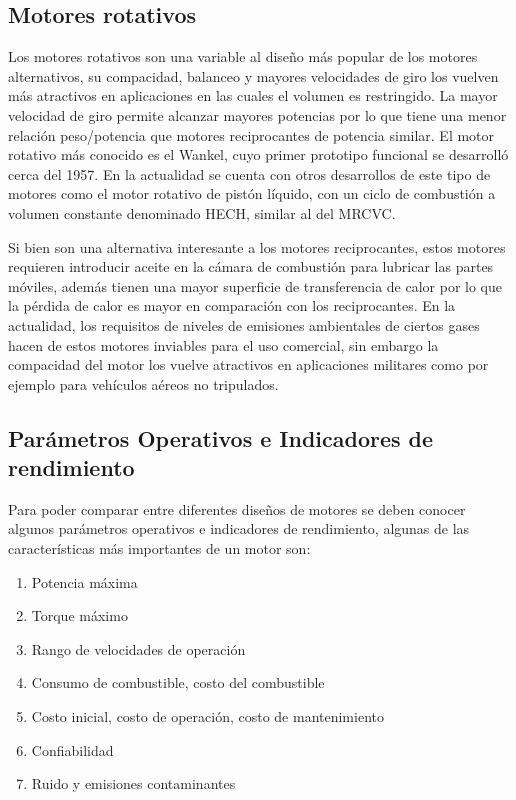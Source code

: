 \subsection{Motores rotativos}
%
Los motores rotativos son una variable al diseño más popular de los motores
alternativos, su compacidad, balanceo y mayores velocidades de giro los vuelven
más atractivos en aplicaciones en las cuales el volumen es restringido.
%
La mayor velocidad de giro permite alcanzar mayores potencias por lo que tiene
una menor relación peso/potencia que motores reciprocantes de potencia similar.
%
El motor rotativo más conocido es el Wankel, cuyo primer prototipo funcional se
desarrolló cerca del 1957.
%
En la actualidad se cuenta con otros desarrollos de este tipo de motores como el
motor rotativo de pistón líquido, con un ciclo de combustión a volumen constante
denominado HECH\parencite{hehc_05}, similar al del MRCVC.

Si bien son una alternativa interesante a los motores reciprocantes, estos
motores requieren introducir aceite en la cámara de combustión para lubricar las
partes móviles, además tienen una mayor superficie de transferencia de calor por
lo que la pérdida de calor es mayor en comparación con los reciprocantes.
%
En la actualidad, los requisitos de niveles de emisiones ambientales de ciertos
gases hacen de estos motores inviables para el uso comercial, sin embargo la
compacidad del motor los vuelve atractivos en aplicaciones militares como por
ejemplo para vehículos aéreos no tripulados.



\subsection{Parámetros Operativos e Indicadores de rendimiento}
%
Para poder comparar entre diferentes diseños de motores se deben conocer algunos
parámetros operativos e indicadores de rendimiento, algunas de las
características más importantes de un motor son:
%
\begin{enumerate}
    \item Potencia máxima
    \item Torque máximo
    \item Rango de velocidades de operación
    \item Consumo de combustible, costo del combustible
    \item Costo inicial, costo de operación, costo de mantenimiento
    \item Confiabilidad
    \item Ruido y emisiones contaminantes
\end{enumerate}

